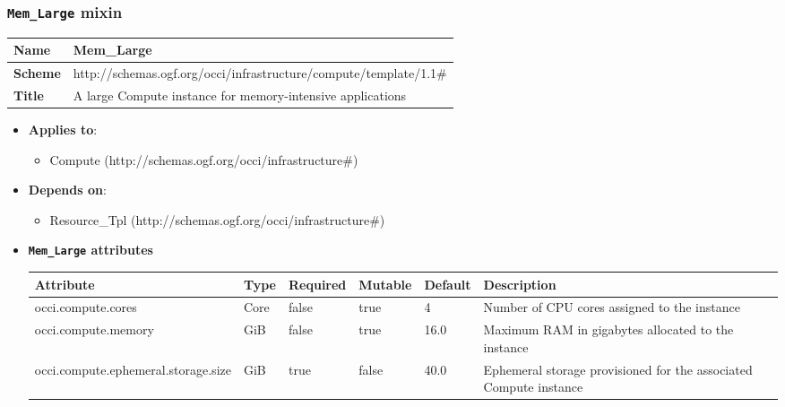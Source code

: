  
\subsubsection{\texttt{Mem\_Large} mixin}
\begin{center}
\begin{tabular}{|l|l|}
  \hline
  \textbf{Name} & Mem\_Large \\
  \hline  
  \textbf{Scheme} & http://schemas.ogf.org/occi/infrastructure/compute/template/1.1\# \\
  \hline
  \textbf{Title} & A large Compute instance for memory-intensive applications \\
  \hline
\end{tabular}
\end{center}
\begin{itemize}
\item \textbf{Applies to}:
\begin{itemize}
	\item Compute (http://schemas.ogf.org/occi/infrastructure\#)
\end{itemize}
\end{itemize} 
\begin{itemize}
\item \textbf{Depends on}:
\begin{itemize}
	\item Resource\_Tpl (http://schemas.ogf.org/occi/infrastructure\#)
\end{itemize}
\end{itemize}

\begin{itemize}
\item \textbf{\texttt{Mem\_Large} attributes}

\begin{tabularx}{\textwidth}{|l|l|p{1.4cm}|p{1.3cm}|l|X|}
  \hline
  \textbf{Attribute} & \textbf{Type} & \textbf{Required} & \textbf{Mutable} & \textbf{Default} & \textbf{Description} \\
  \hline  
  occi.compute.cores & Core & false & true & 4 & Number of CPU cores assigned to the instance \\
  \hline
  occi.compute.memory & GiB & false & true & 16.0 & Maximum RAM in gigabytes allocated to the instance \\
  \hline
  occi.compute.ephemeral.storage.size & GiB & true & false & 40.0 & Ephemeral storage provisioned for the associated Compute instance \\
  \hline
\end{tabularx}
\end{itemize}


 
